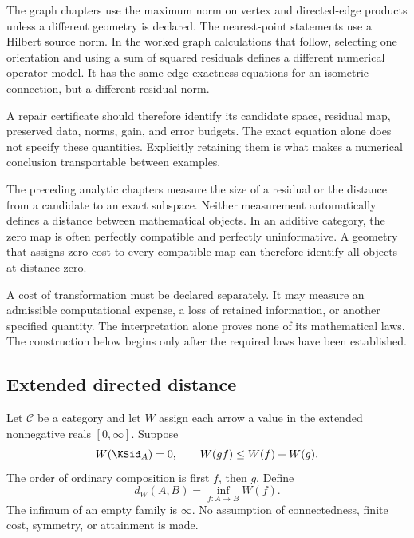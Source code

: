 The graph chapters use the maximum norm on vertex and directed-edge products unless a different geometry is declared. The nearest-point statements use a Hilbert source norm. In the worked graph calculations that follow, selecting one orientation and using a sum of squared residuals defines a different numerical operator model. It has the same edge-exactness equations for an isometric connection, but a different residual norm.

A repair certificate should therefore identify its candidate space, residual map, preserved data, norms, gain, and error budgets. The exact equation alone does not specify these quantities. Explicitly retaining them is what makes a numerical conclusion transportable between examples.




\label{KS:sec:transport-cost}
The preceding analytic chapters measure the size of a residual or the distance from a candidate to an exact subspace. Neither measurement automatically defines a distance between mathematical objects. In an additive category, the zero map is often perfectly compatible and perfectly uninformative. A geometry that assigns zero cost to every compatible map can therefore identify all objects at distance zero.

A cost of transformation must be declared separately. It may measure an admissible computational expense, a loss of retained information, or another specified quantity. The interpretation alone proves none of its mathematical laws. The construction below begins only after the required laws have been established.

\subsection{Extended directed distance}
Let \(\mathcal C\) be a category and let \(W\) assign each arrow a value in the extended nonnegative reals \([0,\infty]\). Suppose
\[
 W(\KSid_A)=0,\qquad W(gf)\le W(f)+W(g).
\]
The order of ordinary composition is first \(f\), then \(g\). Define
\[
 d_W(A,B)=\inf_{f:A\to B}W(f).
\]
The infimum of an empty family is \(\infty\). No assumption of connectedness, finite cost, symmetry, or attainment is made.

